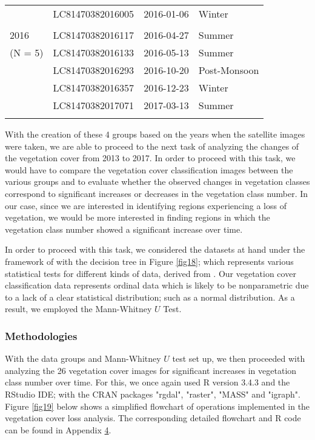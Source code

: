 \begin{ThreePartTable}
\begin{longtable}{L{2.3cm} L{4.2cm} L{3.1cm} L{4.5cm}}
		& LC81470382016005 & 2016-01-06 & Winter \\ \\[-0.3cm]
		2016& LC81470382016117 & 2016-04-27 & Summer \\
		(N = 5)& LC81470382016133 & 2016-05-13 & Summer \\
		& LC81470382016293 & 2016-10-20 & Post-Monsoon \\
		& LC81470382016357 & 2016-12-23 & Winter \\
		& LC81470382017071 & 2017-03-13 & Summer \\\\[-0.4cm]
		\bottomrule[0.25mm]
	\end{longtable}
\end{ThreePartTable}

\justify
With the creation of these 4 groups based on the years when the satellite images were taken, we are able to proceed to the next task of analyzing the changes of the vegetation cover from 2013 to 2017. In order to proceed with this task, we would have to compare the vegetation cover classification images between the various groups and to evaluate whether the observed changes in vegetation classes correspond to significant increases or decreases in the vegetation class number. In our case, since we are interested in identifying regions experiencing a loss of vegetation, we would be more interested in finding regions in which the vegetation class number showed a significant increase over time. 

\justify
In order to proceed with this task, we considered the datasets at hand under the framework of with the decision tree in Figure \ref{fig18}; which represents various statistical tests for different kinds of data, derived from \citet{nayak2011}. Our vegetation cover classification data represents ordinal data which is likely to be nonparametric due to a lack of a clear statistical distribution; such as a normal distribution. As a result, we employed the Mann-Whitney $U$ Test. 

\subsubsection{Methodologies}

\justify
With the data groups and Mann-Whitney $U$ test set up, we then proceeded with analyzing the 26 vegetation cover images for significant increases in vegetation class number over time. For this, we once again used R version 3.4.3 and the RStudio IDE; with the CRAN packages "rgdal", "raster", "MASS" and "igraph". Figure \ref{fig19} below shows a simplified flowchart of operations implemented in the vegetation cover loss analysis. The corresponding detailed flowchart and R code can be found in Appendix \hyperref[app3]{4}. 

